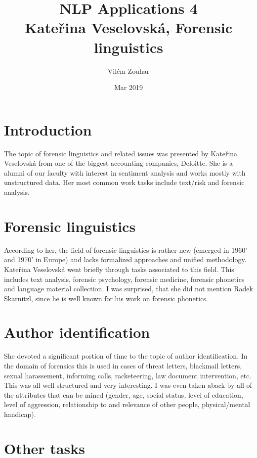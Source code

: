 \documentclass[a4paper]{article}
\begin{document}
\title{NLP Applications 4\\Kateřina Veselovská, Forensic linguistics}
\author{Vilém Zouhar}
\date{Mar 2019}
\maketitle 

\section*{Introduction}

The topic of forensic linguistics and related issues was presented by Kateřina Veselovská from one of the biggest accounting companies, Deloitte. She is a alumni of our faculty with interest in sentiment analysis and works mostly with unstructured data. Her most common work tasks include text/risk and forensic analysis.

\section*{Forensic linguistics}

According to her, the field of forensic linguistics is rather new (emerged in 1960' and 1970' in Europe) and lacks formalized approaches and unified methodology. Kateřina Veselovská went briefly through tasks associated to this field. This includes text analysis, forensic psychology, forensic medicine, forensic phonetics and language material collection. I was surprised, that she did not mention Radek Skarnitzl, since he is well known for his work on forensic phonetics. 

\section*{Author identification}

She devoted a significant portion of time to the topic of author identification. In the domain of forensics this is used in cases of threat letters, blackmail letters, sexual harassement, informing calls, racketeering, law document intervention, etc. This was all well structured and very interesting. I was even taken aback by all of the attributes that can be mined (gender, age, social status, level of education, level of aggression, relationship to and relevance of other people, physical/mental handicap).

\section*{Other tasks}
\end{document}
